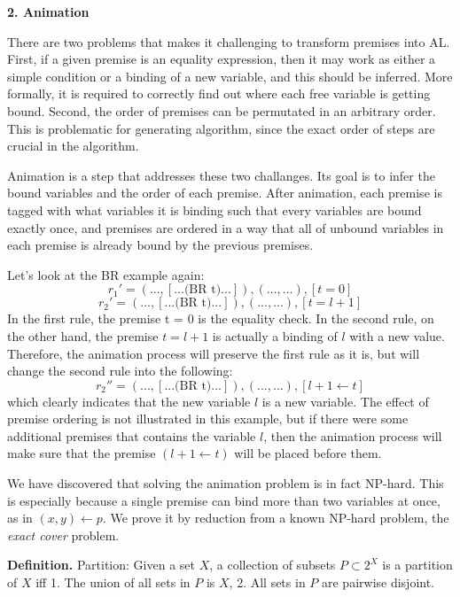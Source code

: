 

\textbf{2. Animation}

There are two problems that makes it challenging to transform premises into AL.
First, if a given premise is an equality expression, then it may work as either a simple condition or
a binding of a new variable, and this should be inferred. More formally, it is required to
correctly find out where each free variable is getting bound. Second, the order
of premises can be permutated in an arbitrary order. This is problematic for
generating algorithm, since the exact order of steps are crucial in the algorithm.

Animation is a step that addresses these two challanges. Its goal is to infer
the bound variables and the order of each premise.
After animation, each premise is tagged with what variables it is binding
such that every variables are bound exactly once, and premises are ordered in a way that
all of unbound variables in each premise is already bound by the previous premises.

Let's look at the BR example again:
\[
r_1' = (..., [... \text{(BR t)} ...]),  (..., ...), [t = 0]
\]
\[
r_2' = (..., [... \text{(BR t)} ...]),  (..., ...), [t = l + 1]
\]
In the first rule, the premise t = 0 is the equality check.
In the second rule, on the other hand, the premise $t = l+1$ is actually a binding of $l$ with a new value.
Therefore, the animation process will preserve the first rule as it is, but will change the
second rule into the following:
\[
r_2'' = (..., [... \text{(BR t)} ...]),  (..., ...), [l + 1 \leftarrow t]
\]
which clearly indicates that the new variable $l$ is a new variable.
The effect of premise ordering is not illustrated in this example, but
if there were some additional premises that contains the variable $l$, then
the animation process will make sure that the premise $(l + 1 \leftarrow t)$ will be
placed before them.

We have discovered that solving the animation problem is in fact NP-hard.
This is especially because a single premise can bind more than two variables at once, as in
$(x,y) \leftarrow p$.
We prove it by reduction from a known NP-hard problem, the \textit{exact cover} problem.

\textbf{Definition.} Partition: Given a set $X$, a collection of subsets $P \subset 2^X$ is a partition of $X$ iff
1. The union of all sets in $P$ is $X$,
2. All sets in $P$ are pairwise disjoint.


